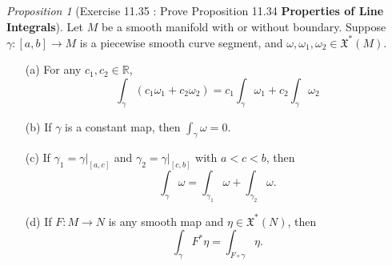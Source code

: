 \documentclass[a4paper]{article}
\theoremstyle{remark}
\newtheorem{prop}{Proposition}
\newcommand{\er}{\mathbb{R}} %
\newcommand{\VF}{\mathfrak{X}} %
\begin{document}
\begin{prop}[Exercise 11.35 : Prove Proposition 11.34 \textbf{Properties of Line Integrals}]
Let $M$ be a smooth manifold with or without boundary. Suppose $\gamma : [a,b] \to M$ is a piecewise smooth curve segment, and $\omega,\omega_1,\omega_2 \in \VF^*(M)$.
\begin{enumerate}[nolistsep]
\item[(a)] For any $c_1,c_2 \in \er$,
$$
\int_{\gamma} (c_1\omega_1 + c_2 \omega_2) = c_1 \int_{\gamma} \omega_1 + c_2 \int_{\gamma} \omega_2
$$
\item[(b)] If $\gamma$ is a constant map, then $\int_{\gamma} \omega = 0$.
\item[(c)] If $\gamma_1 = \gamma|_{[a,c]}$ and $\gamma_{2} = \gamma|_{[c,b]}$ with $a <c<b$, then
$$
\int_{\gamma} \omega = \int_{\gamma_1} \omega + \int_{\gamma_2} \omega.
$$
\item[(d)] If $F : M \to N$ is any smooth map and $\eta \in \VF^*(N)$, then 
$$
\int_{\gamma} F^*\eta = \int_{F \circ \gamma} \eta.
$$  
\end{enumerate}
\end{prop}
\end{document}
